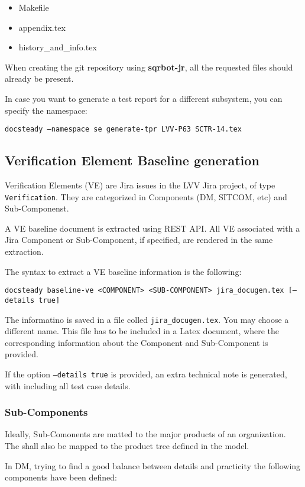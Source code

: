 \documentclass[DM]{lsstdoc}
\begin{document}
\begin{itemize}
\item Makefile
\item appendix.tex
\item history\_and\_info.tex
\end{itemize}

When creating the git repository using \textbf{sqrbot-jr}, all the requested files should already be present.

In case you want to generate a test report for a different subsystem, you can specify the  namespace:

\texttt{docsteady --namespace se generate-tpr LVV-P63 SCTR-14.tex}



\subsection{Verification Element Baseline generation}

Verification Elements (VE) are Jira issues in the LVV Jira project, of type \texttt{Verification}.
They are categorized in Components (DM, SITCOM, etc) and Sub-Componenst.

A VE baseline document is extracted using REST API.
All VE associated with a Jira Component or Sub-Component, if specified, are rendered in the same extraction.

The syntax to extract a VE baseline information is the following:

\texttt{docsteady baseline-ve <COMPONENT> <SUB-COMPONENT> jira_docugen.tex [--details true]}

The informatino is saved in a file colled \texttt{jira_docugen.tex}. You may choose a different name.
This file has to be included in a Latex document, where the corresponding information about the Component and Sub-Component is provided.

If the option \texttt{--details true} is provided, an extra technical note is generated, with including all test case details.


\subsubsection{Sub-Components}

Ideally, Sub-Comonents are matted to the major products of an organization. 
The shall also be mapped to the product tree defined in the model.

In DM, trying to find a good balance between details and practicity the following components have been defined:
\end{document}
